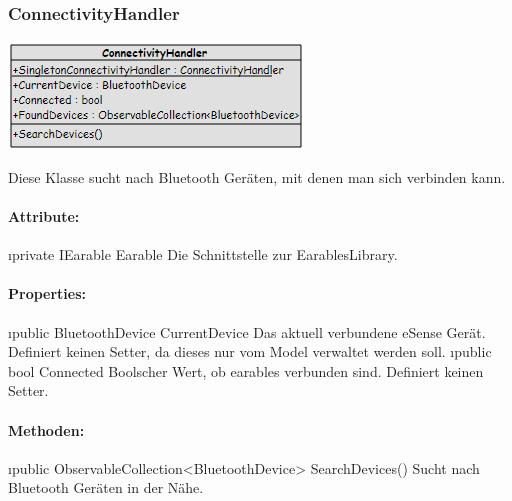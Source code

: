 \documentclass[../entwurf.tex]{subfiles}
\begin{document}
			\subsubsection{ConnectivityHandler}
				\begin{minipage}{0.45\textwidth}
					\includegraphics[width=\textwidth,height=\textheight,keepaspectratio]{../graphics/m_klassen/ConnectivityHandler.png}
				\end{minipage}
				\begin{minipage}{0.55\textwidth}
					Diese Klasse sucht nach Bluetooth Geräten, mit denen man sich verbinden kann.
				\end{minipage}
				\paragraph{Attribute:}
					\begin{itemize}
						\i{private IEarable Earable} Die Schnittstelle zur EarablesLibrary.
					\end{itemize}
				\paragraph{Properties:}
					\begin{itemize}
						\i{public BluetoothDevice CurrentDevice} Das aktuell verbundene eSense Gerät. Definiert keinen Setter, da dieses nur vom Model
						verwaltet werden soll.
						\i{public bool Connected} Boolscher Wert, ob earables verbunden sind. Definiert keinen Setter.
					\end{itemize}
				\paragraph{Methoden:}
					\begin{itemize}
						\i{public ObservableCollection<BluetoothDevice> SearchDevices()} Sucht nach Bluetooth Geräten in der Nähe.
					\end{itemize}
\end{document}
